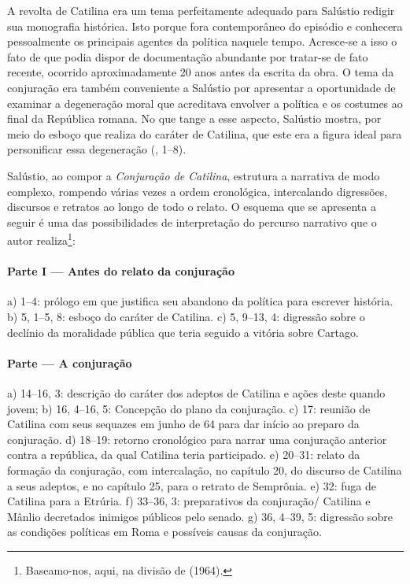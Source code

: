 A revolta de Catilina era um tema perfeitamente adequado para Salústio redigir
sua monografia histórica. Isto porque fora contemporâneo do episódio e
conhecera pessoalmente os principais agentes da política naquele tempo.
Acresce-se a isso o fato de que podia dispor de documentação abundante por
tratar-se de fato recente, ocorrido aproximadamente 20 anos antes da escrita da
obra. O tema da conjuração era também conveniente a Salústio por apresentar a
oportunidade de examinar a degeneração moral que acreditava envolver a política
e os costumes ao final da República romana. No que tange a esse aspecto,
Salústio mostra, por meio do esboço que realiza do caráter de Catilina, que
este era a figura ideal para personificar essa degeneração (, 1--8).

Salústio, ao compor a \emph{Conjuração de Catilina}, estrutura a narrativa de modo
complexo, rompendo várias vezes a ordem cronológica, intercalando digressões,
discursos e retratos ao longo de todo o relato. O esquema que se apresenta a
seguir é uma das possibilidades de interpretação do percurso narrativo que o
autor realiza\footnote{Baseamo-nos, aqui, na divisão de  (1964).}:  

\paragraph{Parte I --- Antes do relato da conjuração}

a)	1--4: prólogo em que justifica seu abandono da política para escrever
história.  b)	5, 1--5, 8: esboço do caráter de Catilina.  c)	5, 9--13, 4:
digressão sobre o declínio da moralidade pública que teria seguido a vitória
sobre Cartago. 

\paragraph{Parte  --- A conjuração}

a)	14--16, 3: descrição do caráter dos adeptos de Catilina e ações deste
quando jovem; b)	16, 4--16, 5: Concepção do plano da conjuração.  c) 	17:
reunião de Catilina com seus sequazes em junho de 64 para dar início ao preparo
da conjuração.  d)	18--19: retorno cronológico para narrar uma conjuração
anterior contra a república, da qual Catilina teria participado.  e)	20--31:
relato da formação da conjuração, com intercalação, no capítulo 20, do discurso
de Catilina a seus adeptos, e no capítulo 25, para o retrato de Semprônia.  e)
32:  fuga de Catilina para a Etrúria.  f)	33--36, 3: preparativos da
conjuração/ Catilina e Mânlio decretados inimigos públicos pelo senado.  g)
36, 4--39, 5: digressão sobre as condições políticas em Roma e possíveis causas
da conjuração.	 	

